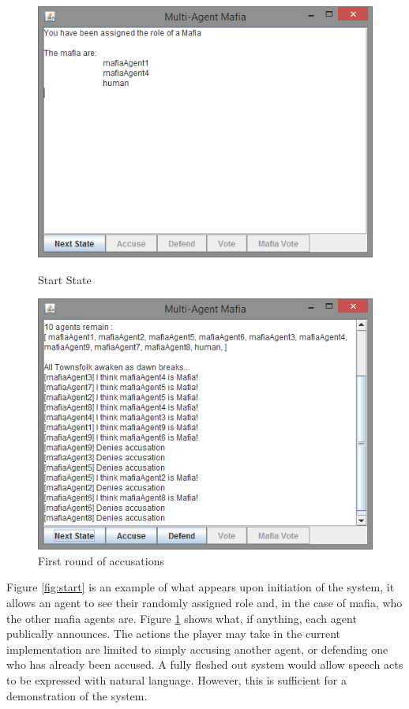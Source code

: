 \documentclass[12pt]{article} %
\begin{document}
\begin{figure}[H]
\centering
\begin{minipage}{0.49\textwidth}
\centering
\includegraphics[width=\linewidth]{mafia-start}
\caption{Start State}
\label{fig:start}
\end{minipage}\hfill
\begin{minipage}{0.49\textwidth}
\centering
\includegraphics[width=\linewidth]{mafia-discussion}
\caption{First round of accusations}
\label{fig:discussion}
\end{minipage}
\end{figure}

Figure \ref{fig:start} is an example of what appears upon initiation of the system, it allows an agent to see their randomly assigned role and, in the case of mafia, who the other mafia agents are. Figure \ref{fig:discussion} shows what, if anything, each agent publically announces. The actions the player may take in the current implementation are limited to simply accusing another agent, or defending one who has already been accused. A fully fleshed out system would allow speech acts to be expressed with natural language. However, this is sufficient for a demonstration of the system.
\end{document}
